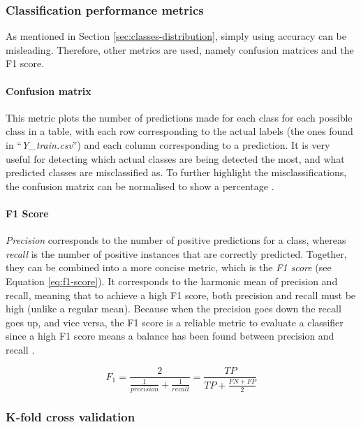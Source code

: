 \documentclass[letterpaper,12pt]{article}
\begin{document}
\subsubsection{Classification performance metrics}
\label{sec:performance-metrics}

As mentioned in Section \ref{sec:classes-distribution}, simply using accuracy can be misleading. Therefore, other metrics are used, namely confusion matrices and the F1 score.

\paragraph{Confusion matrix} This metric plots the number of predictions made for each class for each possible class in a table, with each row corresponding to the actual labels (the ones found in ``\textit{Y\_train.csv}'') and each column corresponding to a prediction. It is very useful for detecting which actual classes are being detected the most, and what predicted classes are misclassified as. To further highlight the misclassifications, the confusion matrix can be normalised to show a percentage \cite{Geron2019}.

\paragraph{F1 Score} \textit{Precision} corresponds to the number of positive predictions for a class, whereas \textit{recall} is the number of positive instances  that are correctly predicted. Together, they can be combined into a more concise metric, which is the \textit{F1 score} (see Equation \ref{eq:f1-score}). It corresponds to the harmonic mean of precision and recall, meaning that to achieve a high F1 score, both precision and recall must be high (unlike a regular mean). Because when  the precision goes down the recall goes up, and vice versa, the F1 score is a reliable metric to evaluate a classifier since a high F1 score means a balance has been found between precision and recall \cite{Geron2019}.

\begin{equation}
\label{eq:f1-score}
    F_{1} = \frac{2}{\frac{1}{precision} + \frac{1}{recall}} = \frac{TP}{TP+\frac{FN + FP}{2}}
\end{equation}

\subsubsection{K-fold cross validation}
\end{document}
